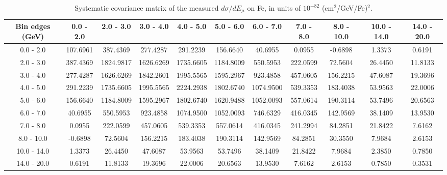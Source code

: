 \documentclass[aps,prl,twocolumn,superscriptaddress,nofootinbib]{revtex4-1}
\begin{document}
\begin{turnpage}
 \begin{table}[h!]
  \centering
  \caption{Systematic covariance matrix of the measured $d\sigma/dE_{\mu}$ on Fe, in units of $10^{-82}$ (cm$^{2}$/GeV/Fe)$^{2}$.}
    \begin{tabular}{c||cccccccccc}
      Bin edges (GeV) & 0.0 - 2.0 & 2.0 - 3.0 & 3.0 - 4.0 & 4.0 - 5.0 & 5.0 - 6.0 & 6.0 - 7.0 & 7.0 - 8.0 & 8.0 - 10.0 & 10.0 - 14.0 & 14.0 - 20.0 \\
\hline \hline
        0.0 - 2.0 & 107.6961 & 387.4369 & 277.4287 & 291.2239 & 156.6640 & 40.6955 &  0.0955 & -0.6898 &  1.3373 &  0.6191 \\
        2.0 - 3.0 & 387.4369 & 1824.9817 & 1626.6269 & 1735.6605 & 1184.8009 & 550.5953 & 222.0599 & 72.5604 & 26.4450 & 11.8133 \\
        3.0 - 4.0 & 277.4287 & 1626.6269 & 1842.2601 & 1995.5565 & 1595.2967 & 923.4858 & 457.0605 & 156.2215 & 47.6087 & 19.3696 \\
        4.0 - 5.0 & 291.2239 & 1735.6605 & 1995.5565 & 2224.2938 & 1802.6740 & 1074.9500 & 539.3353 & 183.4038 & 53.9563 & 22.0006 \\
        5.0 - 6.0 & 156.6640 & 1184.8009 & 1595.2967 & 1802.6740 & 1620.9488 & 1052.0093 & 557.0614 & 190.3114 & 53.7496 & 20.6563 \\
        6.0 - 7.0 & 40.6955 & 550.5953 & 923.4858 & 1074.9500 & 1052.0093 & 746.6329 & 416.0345 & 142.9569 & 38.1409 & 13.9530 \\
        7.0 - 8.0 &  0.0955 & 222.0599 & 457.0605 & 539.3353 & 557.0614 & 416.0345 & 241.2994 & 84.2851 & 21.8422 &  7.6162 \\
       8.0 - 10.0 & -0.6898 & 72.5604 & 156.2215 & 183.4038 & 190.3114 & 142.9569 & 84.2851 & 30.3550 &  7.9684 &  2.6153 \\
      10.0 - 14.0 &  1.3373 & 26.4450 & 47.6087 & 53.9563 & 53.7496 & 38.1409 & 21.8422 &  7.9684 &  2.3850 &  0.7850 \\
      14.0 - 20.0 &  0.6191 & 11.8133 & 19.3696 & 22.0006 & 20.6563 & 13.9530 &  7.6162 &  2.6153 &  0.7850 &  0.3531 \\
    \end{tabular}
  \label{tablecov:Fe_Systematic_Emu}
  \end{table}
\end{turnpage}
\end{document}

